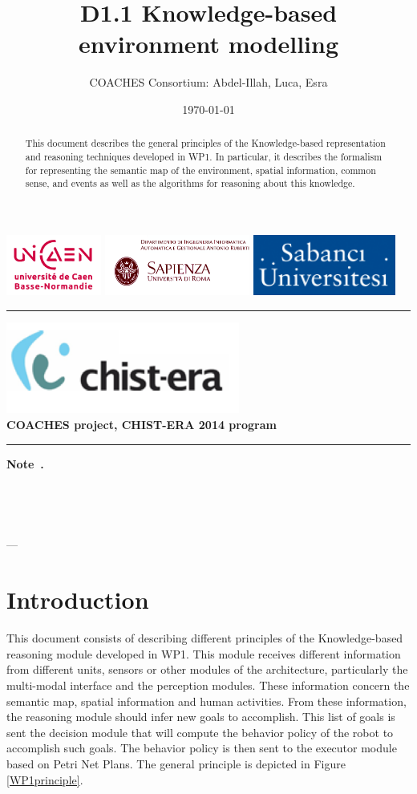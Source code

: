 \documentclass{article}
\title{D1.1 Knowledge-based environment modelling}
\author{COACHES Consortium: Abdel-Illah, Luca, Esra}
\date{\today}
\newcommand{\makemadtitle}{
  \hrule
  \vspace{.5em}
  \noindent
  \begin{center}
  \textbf{
  {\centering\includegraphics[height=3cm]{../logoCHISTERA2014}}\\
   {\centering\Large COACHES project, CHIST-ERA 2014 program}
  }
  \end{center}
  \vspace{.5em}
 
  \hrule
  \vspace{3em}
  \begin{center}
    \begin{large}\textbf{ Note~\usebox{\notenumber}.}\end{large}\\[.5em]
    \begin{Large}\textbf{\usebox{\notetitle}}\end{Large}\\[2em]
    \begin{large}\usebox{\noteauthor} --- \usebox{\notedate}\end{large}
  \end{center}
  \vspace{3em}
}
\begin{document}
\includegraphics[height=2cm]{../fig/logoUNICAEN.jpg}
\includegraphics[height=2cm]{../fig/logoSapienza.png}
\includegraphics[height=2cm]{../fig/logoSebanci}


\makemadtitle

\vspace*{1.0in}
\begin{abstract}
This document describes the general principles of the Knowledge-based representation and reasoning techniques developed in WP1. In particular, it describes the formalism for representing the semantic map of the environment, spatial information, common sense, and events as well as the algorithms for reasoning about this knowledge. 
\end{abstract}

\vspace*{1.5in}

\newpage
\section{Introduction}
This document consists of describing different principles of the Knowledge-based reasoning module developed in WP1. This  module receives different information from different units, sensors or other modules of the architecture, particularly the multi-modal interface and the perception modules. These information concern the semantic map, spatial information and human activities. From these information, the reasoning module should infer new goals to accomplish. This list of goals is sent the decision module that will compute the behavior policy of the robot to accomplish such goals. The behavior policy is then sent to the executor module based on Petri Net Plans. The general principle is depicted in Figure \ref{WP1principle}.
\end{document}
